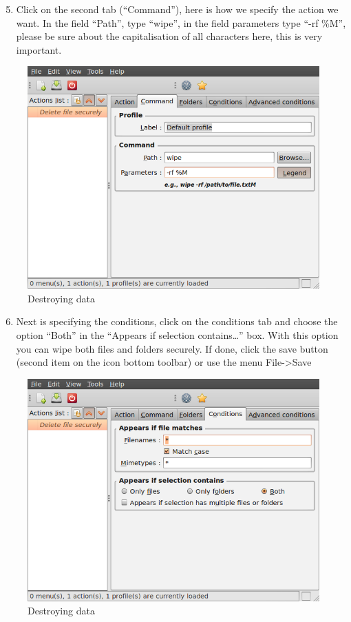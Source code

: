 \begin{enumerate}[1.]
\setcounter{enumi}{4}
\item
  Click on the second tab (``Command''), here is how we specify the
  action we want. In the field ``Path'', type ``wipe'', in the field
  parameters type ``-rf \%M'', please be sure about the capitalisation
  of all characters here, this is very important.
\end{enumerate}
\begin{figure}[htbp]
\centering
\includegraphics{destroy_data_012.png}
\caption{Destroying data}
\end{figure}

\begin{enumerate}[1.]
\setcounter{enumi}{5}
\item
  Next is specifying the conditions, click on the conditions tab and
  choose the option ``Both'' in the ``Appears if selection
  contains\ldots{}'' box. With this option you can wipe both files and
  folders securely. If done, click the save button (second item on the
  icon bottom toolbar) or use the menu File-\textgreater{}Save
\end{enumerate}
\begin{figure}[htbp]
\centering
\includegraphics{destroy_data_013.png}
\caption{Destroying data}
\end{figure}

